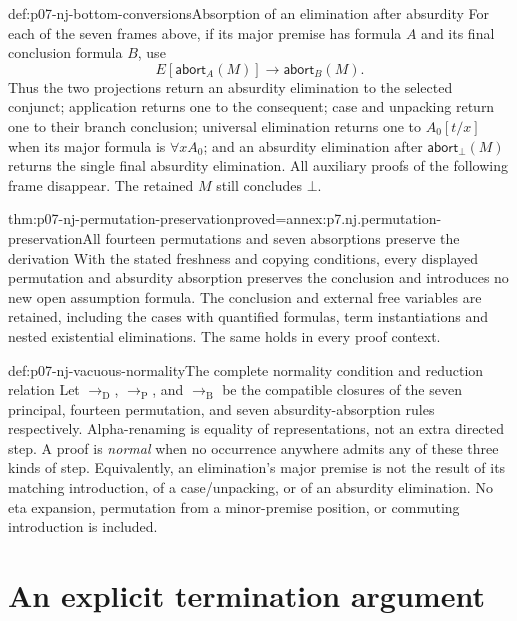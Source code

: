 \begin{hbdefinition}{def:p07-nj-bottom-conversions}{Absorption of an elimination after absurdity}
For each of the seven frames above, if its major premise has
formula \(A\) and its final conclusion formula \(B\), use
\[
                  E[\mathsf{abort}_A(M)]
                   \longrightarrow \mathsf{abort}_B(M).
\]
Thus the two projections return an absurdity elimination to the
selected conjunct; application returns one to the consequent;
case and unpacking return one to their branch conclusion;
universal elimination returns one to \(A_0[t/x]\) when its
major formula is \(\forall x A_0\); and an absurdity elimination
after \(\mathsf{abort}_\bot(M)\) returns the single final
absurdity elimination. All auxiliary proofs of the following
frame disappear. The retained \(M\) still concludes \(\bot\).
\end{hbdefinition}

\begin{hbtheorem}{thm:p07-nj-permutation-preservation}{proved=annex:p7.nj.permutation-preservation}{All fourteen permutations and seven absorptions preserve the derivation}
With the stated freshness and copying conditions, every displayed
permutation and absurdity absorption preserves the conclusion
and introduces no new open assumption formula. The conclusion
and external free variables are retained, including the cases
with quantified formulas, term instantiations and nested
existential eliminations. The same holds in every proof context.
\end{hbtheorem}

\begin{hbdefinition}{def:p07-nj-vacuous-normality}{The complete normality condition and reduction relation}
Let \(\to_{\mathrm D}\), \(\to_{\mathrm P}\), and
\(\to_{\mathrm B}\) be the compatible closures of the seven
principal, fourteen permutation, and seven absurdity-absorption
rules respectively. Alpha-renaming is equality of representations,
not an extra directed step. A proof is \emph{normal} when no
occurrence anywhere admits any of these three kinds of step.
Equivalently, an elimination's major premise is not the result
of its matching introduction, of a case/unpacking, or of an
absurdity elimination. No eta expansion, permutation from a
minor-premise position, or commuting introduction is included.
\end{hbdefinition}

\section{An explicit termination argument}

